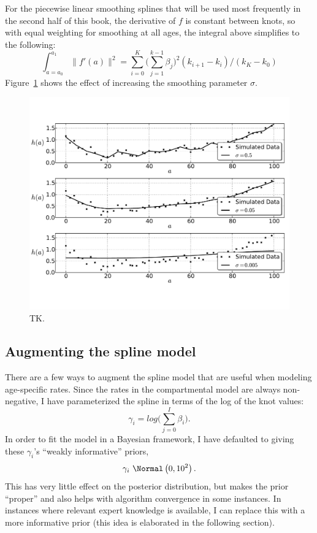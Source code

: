 For the piecewise linear smoothing splines that will be used most
frequently in the second half of this book, the derivative of $f$ is
constant between knots, so with equal weighting for smoothing at all
ages, the integral above simplifies to the following:
\[
\int _{a=a_0} ^{a_1} \| f'(a) \|^2 = \sum_{i=0} ^K \bigg(\sum_{j=1} ^{k-1} \beta_j\bigg)^2(k_{i+1}-k_i) / (k_K - k_0)
\]
Figure~\ref{smoothing-splines} shows the effect of increasing the
smoothing parameter $\sigma$.

\begin{figure}[h]
\begin{center}
\includegraphics[width=\textwidth]{smoothing-splines.pdf}
\caption{TK.}
\label{smoothing-splines}
\end{center}
\end{figure}


\subsection{Augmenting the spline model}
There are a few ways to augment the spline model that are useful when
modeling age-specific rates. Since the rates in the compartmental
model are always non-negative, I have parameterized the spline in
terms of the log of the knot values:
\[
\gamma_i = log\bigg(\sum_{j=0}^I \beta_i\bigg).
\]
In order to fit the model in a Bayesian framework, I have defaulted to
giving these $\gamma_i$'s ``weakly informative'' priors,
\[
\gamma_i ~ \Normal\left(0, 10^2\right).
\]
This has very little effect on the posterior distribution, but makes
the prior ``proper'' and also helps with algorithm convergence in
some instances. In instances where relevant expert knowledge is
available, I can replace this with a more informative prior (this idea
is elaborated in the following section).

